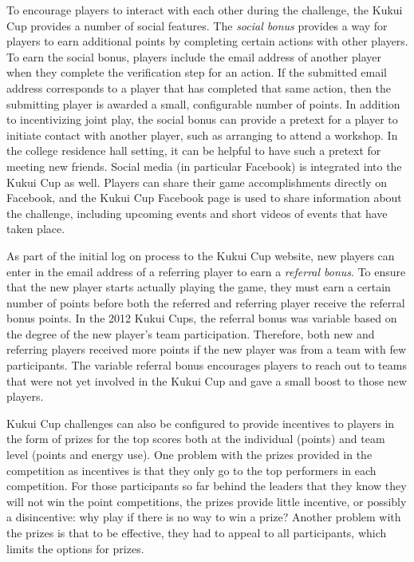 \documentclass[10pt, conference, compsocconf]{IEEEtran-old}
\begin{document}
To encourage players to interact with each other during the challenge, the Kukui Cup provides a number of social features. The \emph{social bonus} provides a way for players to earn additional points by completing certain actions with other players. To earn the social bonus, players include the email address of another player when they complete the verification step for an action. If the submitted email address corresponds to a player that has completed that same action, then the submitting player is awarded a small, configurable number of points. In addition to incentivizing joint play, the social bonus can provide a pretext for a player to initiate contact with another player, such as arranging to attend a workshop. In the college residence hall setting, it can be helpful to have such a pretext for meeting new friends. Social media (in particular Facebook) is integrated into the Kukui Cup as well. Players can share their game accomplishments directly on Facebook, and the Kukui Cup Facebook page is used to share information about the challenge, including upcoming events and short videos of events that have taken place.

As part of the initial log on process to the Kukui Cup website, new players can enter in the email address of a referring player to earn a \emph{referral bonus}. To ensure that the new player starts actually playing the game, they must earn a certain number of points before both the referred and referring player receive the referral bonus points. In the 2012 Kukui Cups, the referral bonus was variable based on the degree of the new player's team participation. Therefore, both new and referring players received more points if the new player was from a team with few participants. The variable referral bonus encourages players to reach out to teams that were not yet involved in the Kukui Cup and gave a small boost to those new players.

Kukui Cup challenges can also be configured to provide incentives to players in the form of prizes for the top scores both at the individual (points) and team level (points and energy use). One problem with the prizes provided in the competition as incentives is that they only go to the top performers in each competition. For those participants so far behind the leaders that they know they will not win the point competitions, the prizes provide little incentive, or possibly a disincentive: why play if there is no way to win a prize? Another problem with the prizes is that to be effective, they had to appeal to all participants, which limits the options for prizes.
\end{document}
